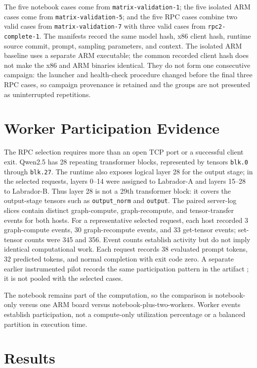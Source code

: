 \documentclass[letterpaper,conference]{IEEEtran}
\begin{document}
The five notebook cases come from \texttt{matrix-validation-1}; the five isolated ARM cases come from \texttt{matrix-validation-5}; and the five RPC cases combine two valid cases from \texttt{matrix-validation-7} with three valid cases from \texttt{rpc2-complete-1}. The manifests record the same model hash, x86 client hash, runtime source commit, prompt, sampling parameters, and context. The isolated ARM baseline uses a separate ARM executable; the common recorded client hash does not make the x86 and ARM binaries identical. They do not form one consecutive campaign: the launcher and health-check procedure changed before the final three RPC cases, so campaign provenance is retained and the groups are not presented as uninterrupted repetitions.

\section{Worker Participation Evidence}

The RPC selection requires more than an open TCP port or a successful client exit. Qwen2.5 has 28 repeating transformer blocks, represented by tensors \texttt{blk.0} through \texttt{blk.27}. The runtime also exposes logical layer 28 for the output stage; in the selected requests, layers 0--14 were assigned to Labrador-A and layers 15--28 to Labrador-B. Thus layer 28 is not a 29th transformer block: it covers the output-stage tensors such as \texttt{output\_norm} and \texttt{output}. The paired server-log slices contain distinct graph-compute, graph-recompute, and tensor-transfer events for both hosts. For a representative selected request, each host recorded 3 graph-compute events, 30 graph-recompute events, and 33 get-tensor events; set-tensor counts were 345 and 356. Event counts establish activity but do not imply identical computational work. Each request records 38 evaluated prompt tokens, 32 predicted tokens, and normal completion with exit code zero. A separate earlier instrumented pilot records the same participation pattern in the artifact \cite{evidence}; it is not pooled with the selected cases.

The notebook remains part of the computation, so the comparison is notebook-only versus one ARM board versus notebook-plus-two-workers. Worker events establish participation, not a compute-only utilization percentage or a balanced partition in execution time.

\section{Results}
\end{document}
